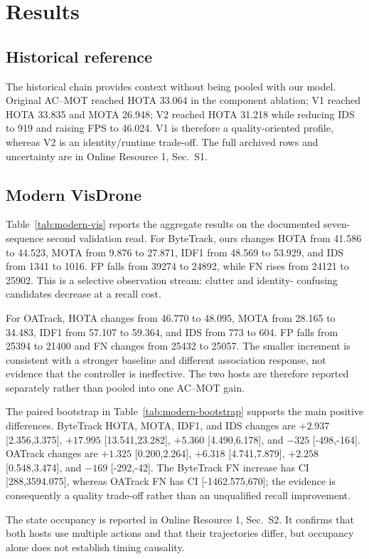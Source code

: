 \section{Results}
\subsection{Historical reference}
The historical chain provides context without being pooled with our model. Original
AC--MOT reached HOTA 33.064 in the component ablation; V1 reached HOTA 33.835
and MOTA 26.948; V2 reached HOTA 31.218 while reducing IDS to 919 and raising
FPS to 46.024. V1 is therefore a quality-oriented profile, whereas V2 is an
identity/runtime trade-off. The full archived rows and uncertainty are in
Online Resource 1, Sec.~S1.

\subsection{Modern VisDrone}
Table~\ref{tab:modern-vis} reports the aggregate results on the documented
seven-sequence second validation read. For ByteTrack, ours changes HOTA from
41.586 to 44.523, MOTA from 9.876 to 27.871, IDF1 from 48.569 to 53.929, and
IDS from 1341 to 1016. FP falls from 39274 to 24892, while FN rises from 24121
to 25902. This is a selective observation stream: clutter and identity-
confusing candidates decrease at a recall cost.

For OATrack, HOTA changes from 46.770 to 48.095, MOTA from 28.165 to 34.483,
IDF1 from 57.107 to 59.364, and IDS from 773 to 604. FP falls from 25394 to
21400 and FN changes from 25432 to 25057. The smaller increment is consistent
with a stronger baseline and different association response, not evidence that
the controller is ineffective. The two hosts are therefore reported separately
rather than pooled into one AC--MOT gain.

The paired bootstrap in Table~\ref{tab:modern-bootstrap} supports the main
positive differences. ByteTrack HOTA, MOTA, IDF1, and IDS changes are
$+2.937$ [2.356,3.375], $+17.995$ [13.541,23.282], $+5.360$ [4.490,6.178],
and $-325$ [-498,-164]. OATrack changes are $+1.325$ [0.200,2.264],
$+6.318$ [4.741,7.879], $+2.258$ [0.548,3.474], and $-169$ [-292,-42]. The
ByteTrack FN increase has CI [288,3594.075], whereas OATrack FN has CI
[-1462.575,670]; the evidence is consequently a quality trade-off rather than
an unqualified recall improvement.

The state occupancy is reported in Online Resource 1, Sec.~S2. It
confirms that both hosts use multiple actions and that their trajectories
differ, but occupancy alone does not establish timing causality.
